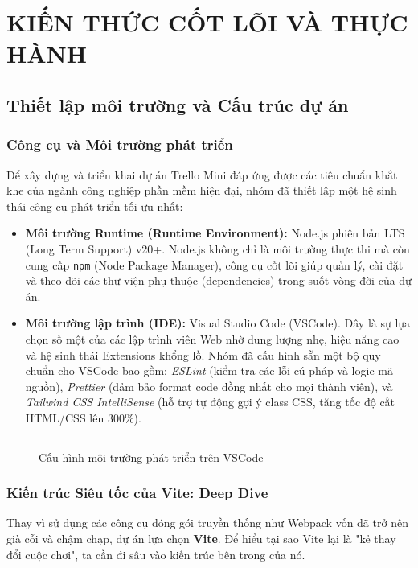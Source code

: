 \part{KIẾN THỨC CỐT LÕI VÀ THỰC HÀNH}

\chapter{Thiết lập môi trường và Cấu trúc dự án}

\section{Công cụ và Môi trường phát triển}
Để xây dựng và triển khai dự án Trello Mini đáp ứng được các tiêu chuẩn khắt khe của ngành công nghiệp phần mềm hiện đại, nhóm đã thiết lập một hệ sinh thái công cụ phát triển tối ưu nhất:
\begin{itemize}
    \item \textbf{Môi trường Runtime (Runtime Environment):} Node.js phiên bản LTS (Long Term Support) v20+. Node.js không chỉ là môi trường thực thi mà còn cung cấp \texttt{npm} (Node Package Manager), công cụ cốt lõi giúp quản lý, cài đặt và theo dõi các thư viện phụ thuộc (dependencies) trong suốt vòng đời của dự án.
    \item \textbf{Môi trường lập trình (IDE):} Visual Studio Code (VSCode). Đây là sự lựa chọn số một của các lập trình viên Web nhờ dung lượng nhẹ, hiệu năng cao và hệ sinh thái Extensions khổng lồ. Nhóm đã cấu hình sẵn một bộ quy chuẩn cho VSCode bao gồm: \textit{ESLint} (kiểm tra các lỗi cú pháp và logic mã nguồn), \textit{Prettier} (đảm bảo format code đồng nhất cho mọi thành viên), và \textit{Tailwind CSS IntelliSense} (hỗ trợ tự động gợi ý class CSS, tăng tốc độ cắt HTML/CSS lên 300\%).
\end{itemize}

\begin{figure}[H]
    \centering
    \rule{0.8\textwidth}{0.4\textwidth}
    \caption{Cấu hình môi trường phát triển trên VSCode}
\end{figure}

\section{Kiến trúc Siêu tốc của Vite: Deep Dive}
Thay vì sử dụng các công cụ đóng gói truyền thống như Webpack vốn đã trở nên già cỗi và chậm chạp, dự án lựa chọn \textbf{Vite}. Để hiểu tại sao Vite lại là "kẻ thay đổi cuộc chơi", ta cần đi sâu vào kiến trúc bên trong của nó.

